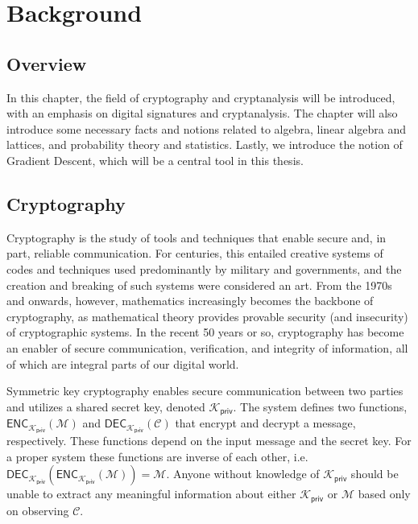 \newcommand{\privkey}{\mathcal{K}_{\mathsf{priv}}}
\newcommand{\pubkey}{\mathcal{K}_{\mathsf{pub}}}
\newcommand{\enc}[1]{\mathsf{ENC}_{\privkey}(#1)}
\newcommand{\encpub}[1]{\mathsf{ENC}_{\pubkey}(#1)}
\newcommand{\dec}[1]{\mathsf{DEC}_{\privkey}(#1)}

\chapter{Background}
\section{Overview}
In this chapter, the field of cryptography and cryptanalysis will be introduced, with an emphasis on digital signatures and cryptanalysis.  
The chapter will also introduce some necessary facts and notions related to algebra, linear algebra and lattices, and probability theory and statistics.
Lastly, we introduce the notion of Gradient Descent, which will be a central tool in this thesis.

\section{Cryptography}
Cryptography is the study of tools and techniques that enable secure and, in part, reliable communication. For centuries, this entailed creative systems of codes and techniques used predominantly by military and governments,
and the creation and breaking of such systems were considered an art. %
From the 1970s and onwards, however, mathematics increasingly becomes the backbone of cryptography, as mathematical theory provides provable security (and insecurity) of cryptographic systems. 
In the recent 50 years or so, cryptography has become an enabler of secure communication, verification, and integrity of information, all of which are integral parts of our digital world. \cite{KL20}

Symmetric key cryptography enables secure communication between two parties and utilizes a shared secret key, denoted $\privkey$. The system defines two functions,
$\enc{\mathcal{M}}$ and $\dec{\mathcal{C}}$ that encrypt and decrypt a message, respectively. These functions depend on the input message and the secret key. 
For a proper system these functions are inverse of each other, i.e. $\dec{\enc{\mathcal{M}}} = \mathcal{M}$. Anyone without knowledge of $\privkey$ should be unable to
extract any meaningful information about either $\privkey$ or $\mathcal{M}$ based only on observing $\mathcal{C}$.

